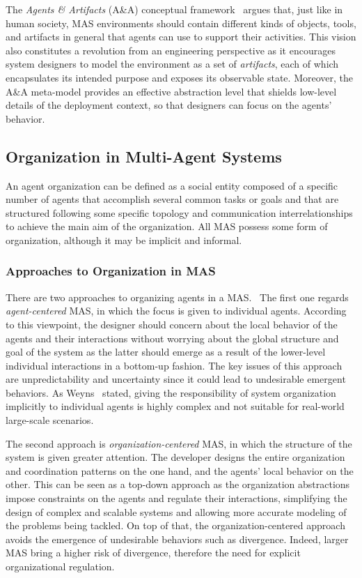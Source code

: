 The \textit{Agents \& Artifacts} (A\&A) conceptual framework~\cite{ricci2007artifacts} argues that, just like in human society, MAS environments should contain different kinds of objects, tools, and artifacts in general that agents can use to support their activities.
This vision also constitutes a revolution from an engineering perspective as it encourages system designers to model the environment as a set of \textit{artifacts}, each of which encapsulates its intended purpose and exposes its observable state.
Moreover, the A\&A meta-model provides an effective abstraction level that shields low-level details of the deployment context, so that designers can focus on the agents' behavior.

\subsection{Organization in Multi-Agent Systems}
An agent organization can be defined as a social entity composed of a specific number of agents that accomplish several common tasks or goals and that are structured following some specific topology and communication interrelationships to achieve the main aim of the organization.
All MAS possess some form of organization, although it may be implicit and informal.

\subsubsection{Approaches to Organization in MAS}
There are two approaches to organizing agents in a MAS.~\cite{Ahmed_Abbas_2015}
The first one regards \textit{agent-centered} MAS, in which the focus is given to individual agents.
According to this viewpoint, the designer should concern about the local behavior of the agents and their interactions without worrying about the global structure and goal of the system as the latter should emerge as a result of the lower-level individual interactions in a bottom-up fashion.
The key issues of this approach are unpredictability and uncertainty since it could lead to undesirable emergent behaviors.
As Weyns~\cite{weyns2010organizations} stated, giving the responsibility of system organization implicitly to individual agents is highly complex and not suitable for real-world large-scale scenarios.

The second approach is \textit{organization-centered} MAS, in which the structure of the system is given greater attention.
The developer designs the entire organization and coordination patterns on the one hand, and the agents' local behavior on the other.
This can be seen as a top-down approach as the organization abstractions impose constraints on the agents and regulate their interactions, simplifying the design of complex and scalable systems and allowing more accurate modeling of the problems being tackled.
On top of that, the organization-centered approach avoids the emergence of undesirable behaviors such as divergence.
Indeed, larger MAS bring a higher risk of divergence, therefore the need for explicit organizational regulation.

